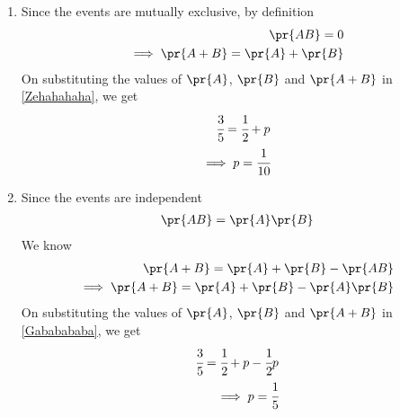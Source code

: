 \begin{enumerate}[label={\roman*)}]
    \item Since the events are mutually exclusive, by definition
\begin{align}
    \pr{AB} = 0\\
    \implies \pr{A + B} = \pr{A} + \pr{B}\label{Zehahahaha}
\end{align}
On substituting the values of $\pr{A}$, $\pr{B}$ and $\pr{A+B}$ in \eqref{Zehahahaha}, we get
\begin{align}
    \cfrac{3}{5} = \cfrac{1}{2} + p\\
    \implies p = \cfrac{1}{10}
\end{align}
    \item Since the events are independent
\begin{align}
    \pr{AB} = \pr{A}\pr{B}
\end{align}
We know
\begin{align}
    \pr{A+B} = \pr{A} + \pr{B} - \pr{AB}\\
    \implies \pr{A+B} = \pr{A} + \pr{B} - \pr{A}\pr{B}\label{Gababababa}
\end{align}
On substituting the values of $\pr{A}$, $\pr{B}$ and $\pr{A+B}$ in \eqref{Gababababa}, we get
\begin{align}
    \cfrac{3}{5} = \cfrac{1}{2} + p - \cfrac{1}{2} p\\
    \implies p = \cfrac{1}{5}
\end{align}
\end{enumerate}